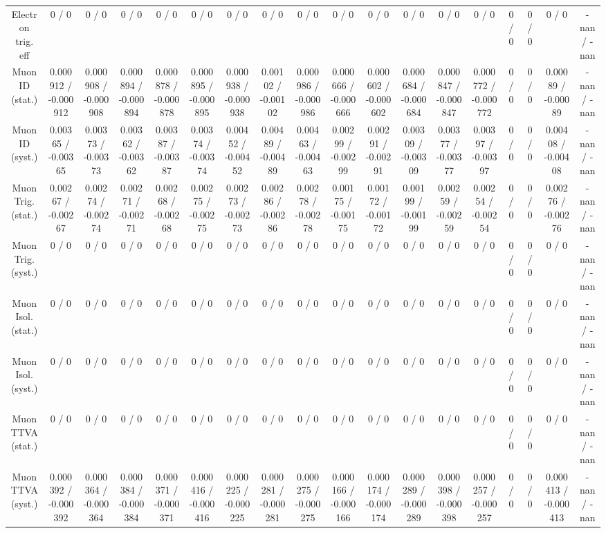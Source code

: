\documentclass[10pt]{article}
\begin{document}
\begin{table}[htbp]
\begin{center}
\begin{tabular}{|c|c|c|c|c|c|c|c|c|c|c|c|c|c|c|c|c|c|}
  Electron trig. eff & 0 / 0 & 0 / 0 & 0 / 0 & 0 / 0 & 0 / 0 & 0 / 0 & 0 / 0 & 0 / 0 & 0 / 0 & 0 / 0 & 0 / 0 & 0 / 0 & 0 / 0 & 0 / 0 & 0 / 0 & 0 / 0 & -nan / -nan \\ 
  Muon ID (stat.) & 0.000912 / -0.000912 & 0.000908 / -0.000908 & 0.000894 / -0.000894 & 0.000878 / -0.000878 & 0.000895 / -0.000895 & 0.000938 / -0.000938 & 0.00102 / -0.00102 & 0.000986 / -0.000986 & 0.000666 / -0.000666 & 0.000602 / -0.000602 & 0.000684 / -0.000684 & 0.000847 / -0.000847 & 0.000772 / -0.000772 & 0 / 0 & 0 / 0 & 0.00089 / -0.00089 & -nan / -nan \\ 
  Muon ID (syst.) & 0.00365 / -0.00365 & 0.00373 / -0.00373 & 0.00362 / -0.00362 & 0.00387 / -0.00387 & 0.00374 / -0.00374 & 0.00452 / -0.00452 & 0.00489 / -0.00489 & 0.00463 / -0.00463 & 0.00299 / -0.00299 & 0.00291 / -0.00291 & 0.00309 / -0.00309 & 0.00377 / -0.00377 & 0.00397 / -0.00397 & 0 / 0 & 0 / 0 & 0.00408 / -0.00408 & -nan / -nan \\ 
  Muon Trig. (stat.) & 0.00267 / -0.00267 & 0.00274 / -0.00274 & 0.00271 / -0.00271 & 0.00268 / -0.00268 & 0.00275 / -0.00275 & 0.00273 / -0.00273 & 0.00286 / -0.00286 & 0.00278 / -0.00278 & 0.00175 / -0.00175 & 0.00172 / -0.00172 & 0.00199 / -0.00199 & 0.00259 / -0.00259 & 0.00254 / -0.00254 & 0 / 0 & 0 / 0 & 0.00276 / -0.00276 & -nan / -nan \\ 
  Muon Trig. (syst.) & 0 / 0 & 0 / 0 & 0 / 0 & 0 / 0 & 0 / 0 & 0 / 0 & 0 / 0 & 0 / 0 & 0 / 0 & 0 / 0 & 0 / 0 & 0 / 0 & 0 / 0 & 0 / 0 & 0 / 0 & 0 / 0 & -nan / -nan \\ 
  Muon Isol. (stat.) & 0 / 0 & 0 / 0 & 0 / 0 & 0 / 0 & 0 / 0 & 0 / 0 & 0 / 0 & 0 / 0 & 0 / 0 & 0 / 0 & 0 / 0 & 0 / 0 & 0 / 0 & 0 / 0 & 0 / 0 & 0 / 0 & -nan / -nan \\ 
  Muon Isol. (syst.) & 0 / 0 & 0 / 0 & 0 / 0 & 0 / 0 & 0 / 0 & 0 / 0 & 0 / 0 & 0 / 0 & 0 / 0 & 0 / 0 & 0 / 0 & 0 / 0 & 0 / 0 & 0 / 0 & 0 / 0 & 0 / 0 & -nan / -nan \\ 
  Muon TTVA (stat.) & 0 / 0 & 0 / 0 & 0 / 0 & 0 / 0 & 0 / 0 & 0 / 0 & 0 / 0 & 0 / 0 & 0 / 0 & 0 / 0 & 0 / 0 & 0 / 0 & 0 / 0 & 0 / 0 & 0 / 0 & 0 / 0 & -nan / -nan \\ 
  Muon TTVA (syst.) & 0.000392 / -0.000392 & 0.000364 / -0.000364 & 0.000384 / -0.000384 & 0.000371 / -0.000371 & 0.000416 / -0.000416 & 0.000225 / -0.000225 & 0.000281 / -0.000281 & 0.000275 / -0.000275 & 0.000166 / -0.000166 & 0.000174 / -0.000174 & 0.000289 / -0.000289 & 0.000398 / -0.000398 & 0.000257 / -0.000257 & 0 / 0 & 0 / 0 & 0.000413 / -0.000413 & -nan / -nan \\ 

\end{tabular}
\end{center}
\end{table}
\end{document}
